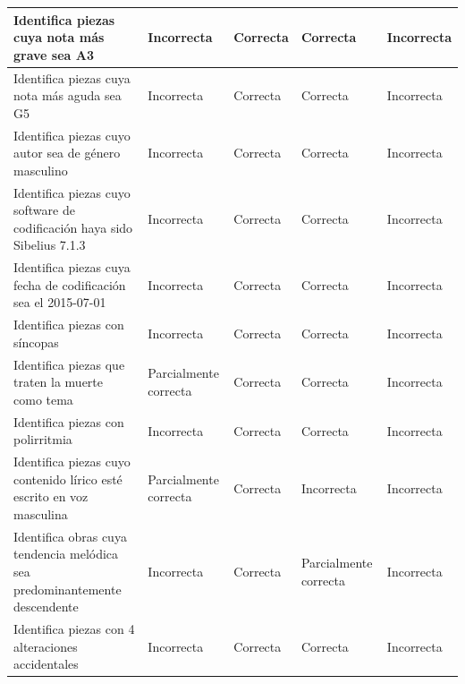 \begin{longtable}{|m{5cm}|m{2.5cm}|m{2.5cm}|m{2.5cm}|m{2.5cm}|}
\hline

Identifica piezas cuya nota más grave sea A3 &
Incorrecta &
Correcta &
Correcta &
Incorrecta \\

\hline

Identifica piezas cuya nota más aguda sea G5 &
Incorrecta &
Correcta &
Correcta &
Incorrecta \\

\hline

Identifica piezas cuyo autor sea de género masculino &
Incorrecta &
Correcta &
Correcta &
Incorrecta \\

\hline

Identifica piezas cuyo software de codificación haya sido Sibelius 7.1.3 &
Incorrecta &
Correcta &
Correcta &
Incorrecta \\

\hline

Identifica piezas cuya fecha de codificación sea el 2015-07-01 &
Incorrecta &
Correcta &
Correcta &
Incorrecta \\

\hline

Identifica piezas con síncopas &
Incorrecta &
Correcta &
Correcta &
Incorrecta \\

\hline

Identifica piezas que traten la muerte como tema &
Parcialmente correcta &
Correcta &
Correcta &
Incorrecta \\

\hline

Identifica piezas con polirritmia &
Incorrecta &
Correcta &
Correcta &
Incorrecta \\

\hline

Identifica piezas cuyo contenido lírico esté escrito en voz masculina &
Parcialmente correcta &
Correcta &
Incorrecta &
Incorrecta \\

\hline

Identifica obras cuya tendencia melódica sea predominantemente descendente &
Incorrecta &
Correcta &
Parcialmente correcta &
Incorrecta \\

\hline

Identifica piezas con 4 alteraciones accidentales &
Incorrecta &
Correcta &
Correcta &
Incorrecta \\


\end{longtable}
